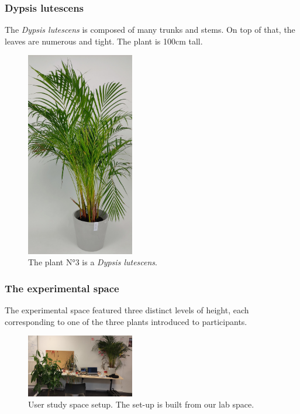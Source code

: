 \newpage

\subsubsection{Dypsis lutescens}

The \textit{Dypsis lutescens} is composed of many trunks and stems. On top of that, the leaves are numerous and tight. The plant is 100cm tall.

\begin{figure}[ht]
    \centering
    \includegraphics[width=0.42\textwidth, angle=-90]{Images/fougere_plant.jpg}
    \caption{The plant N°3 is a \textit{Dypsis lutescens}.}
    
    \vspace{-0.5cm}
    \label{fig:fougere_plant}
    \vspace{0.2cm}
\end{figure}



\subsubsection{The experimental space}

The experimental space featured three distinct levels of height, each corresponding to one of the three plants introduced to participants.

\begin{figure}[h]
    \centering
    \includegraphics[width=0.42\textwidth]{Images/setup_user_study.jpg}
    \caption{User study space setup. The set-up is built from our lab space.}
    
    \vspace{-0.5cm}
    \label{fig:setup_user_study}
    \vspace{0.2cm}
\end{figure}

\newpage

